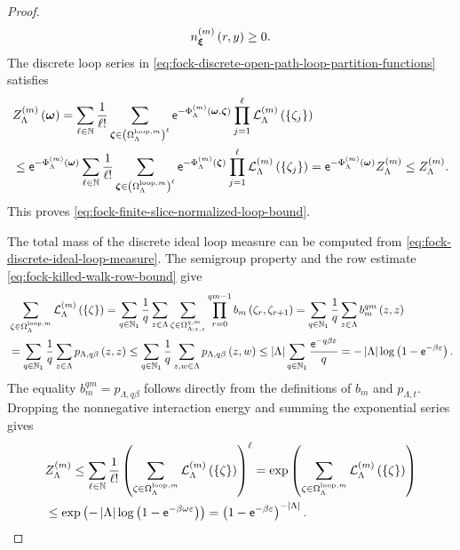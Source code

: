 \documentclass[11pt,a4paper]{article}
\theoremstyle{plain}
\theoremstyle{definition}
\theoremstyle{remark}
\begin{document}
\begin{proof}
$$\begin{aligned}
n_{\boldsymbol{\xi}}^{(m)} \left( r,y \right)
\geq
0.
\end{aligned}$$
The discrete loop series in
\eqref{eq:fock-discrete-open-path-loop-partition-functions} satisfies
$$\begin{aligned}
&
Z_{\Lambda}^{(m)} \left( \boldsymbol{\omega} \right)
=
\sum_{\ell \in \mathbb{N}}\frac{1}{\ell!}
\sum_{\boldsymbol{\zeta}\in\left( \Omega_{\Lambda}^{\mathrm{loop},m} \right)^{\ell}}
\mathsf{e}^{-\Phi_{\Lambda}^{(m)} \left( \boldsymbol{\omega},\boldsymbol{\zeta} \right)}
\prod_{j = 1}^{\ell}
\mathcal{L}_{\Lambda}^{(m)} \left( \left\{ \zeta_j \right\} \right)
\\
& \leq
\mathsf{e}^{-\Phi_{\Lambda}^{(m)} \left( \boldsymbol{\omega} \right)}
\sum_{\ell \in \mathbb{N}}\frac{1}{\ell!}
\sum_{\boldsymbol{\zeta}\in\left( \Omega_{\Lambda}^{\mathrm{loop},m} \right)^{\ell}}
\mathsf{e}^{-\Phi_{\Lambda}^{(m)} \left( \boldsymbol{\zeta} \right)}
\prod_{j = 1}^{\ell}
\mathcal{L}_{\Lambda}^{(m)} \left( \left\{ \zeta_j \right\} \right)
=
\mathsf{e}^{-\Phi_{\Lambda}^{(m)} \left( \boldsymbol{\omega} \right)}
Z_{\Lambda}^{(m)}
\leq
Z_{\Lambda}^{(m)}.
\end{aligned}$$
This proves \eqref{eq:fock-finite-slice-normalized-loop-bound}.

The total mass of the discrete ideal loop measure can be computed from
\eqref{eq:fock-discrete-ideal-loop-measure}.
The semigroup property and the row estimate \eqref{eq:fock-killed-walk-row-bound} give
$$\begin{aligned}
&
\sum_{\zeta\in\Omega_{\Lambda}^{\mathrm{loop},m}}
\mathcal{L}_{\Lambda}^{(m)} \left( \left\{ \zeta \right\} \right)
=
\sum_{q \in \mathbb{N}_1}\frac{1}{q}
\sum_{z \in \Lambda}
\sum_{\zeta\in\Omega_{\Lambda;z,z}^{q,m}}
\prod_{r = 0}^{qm-1}
b_m \left( \zeta_r,\zeta_{r+1} \right)
=
\sum_{q \in \mathbb{N}_1}\frac{1}{q}
\sum_{z \in \Lambda}
b_m^{qm} \left( z,z \right)
\\
& =
\sum_{q \in \mathbb{N}_1}\frac{1}{q}
\sum_{z \in \Lambda}
p_{\Lambda,q\beta} \left( z,z \right)
\leq
\sum_{q \in \mathbb{N}_1}\frac{1}{q}
\sum_{z,w \in \Lambda}
p_{\Lambda,q\beta} \left( z,w \right)
\leq
\left| \Lambda \right|
\sum_{q \in \mathbb{N}_1}
\frac{\mathsf{e}^{-q\beta\varepsilon}}{q}
=
-\left| \Lambda \right|
\log\left( 1-\mathsf{e}^{-\beta\varepsilon} \right).
\end{aligned}$$
The equality $b_m^{qm}=p_{\Lambda,q\beta}$ follows directly from the definitions of $b_m$ and
$p_{\Lambda,t}$.
Dropping the nonnegative interaction energy and summing the exponential series gives
$$\begin{aligned}
&Z_{\Lambda}^{(m)}
\leq
\sum_{\ell \in \monnat}\frac{1}{\ell!}
\rbk{
\sum_{\zeta\in\Omega_{\Lambda}^{\mathrm{loop},m}}
\fun{\msrcal{L}_{\Lambda}^{(m)}}{\setone{\zeta}}}^{\ell}
=
\fnexp{
\sum_{\zeta\in\Omega_{\Lambda}^{\mathrm{loop},m}}
\fun{\msrcal{L}_{\Lambda}^{(m)}}{\setone{\zeta}}}
\\ %
& \leq
\fnexp{
-\abscard{\Lambda}
\fun{\log}{1 - \napiernum^{-\sminvtemperature\omega \varepsilon}}}
=
\rbk{1-\napiernum^{-\beta\varepsilon}}^{-\abscard{\Lambda}}.
\end{aligned}$$


\end{proof}
\end{document}
